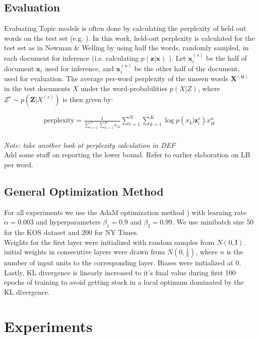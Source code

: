 \documentclass{report}
\begin{document}
	\subsection{Evaluation}
	Evaluating Topic models is often done by calculating the perplexity of held out words on the test set (e.g. \cite{blei2003latent, newman2007distributed, ranganath2015deep}). In this work, held-out perplexity is calculated for the test set as in Newman \& Welling \cite{newman2007distributed} by using half the words, randomly sampled, in each document for inference (i.e. calculating $p(\mathbf{z}|\mathbf{x})$ ). Let $\mathbf{x}_{i}^{(s)}$ be the half of document $\mathbf{x}_i$ used for inference, and $\mathbf{x}_{i}^{(u)}$ be the other half of the document, used for evaluation. The average per-word perplexity of the unseen words $\mathbf{X^{(u)}}$ in the test documents $X$ under the word-probabilities $p(X|Z)$, where $Z^s \sim p(\mathbf{Z}|X^{(s)})$ is then given by:
	
	
	\begin{align}
	\text{perplexity} =  \frac{1}{\sum\limits_{i=1}^{N}\sum\limits_{k=1}^{K}x_{ik}}\sum\limits_{i=1}^N\sum\limits_{k=1}^{K} \log p(x_{k}|\mathbf{z}_{i}^{s})x_{ik}^{u}
	\end{align}\\
	\textit{Note: take another look at perplexity calculation in DEF}
	\\
	Add some stuff on reporting the lower bound. Refer to earlier elaboration on LB per word.
	
	\subsection{General Optimization Method}\label{optim_section}
	For all experiments we use the AdaM optimization method \cite{kingma2014adam}) with learning rate $\alpha = 0.003$ and hyperparameters $\beta_1 = 0.9$ and $\beta_2 = 0.99$. We use minibatch size 50 for the KOS dataset and 200 for NY Times. \\
	Weights for the first layer were initialized with random samples from $N(0,\text{I})$. initial weights in consecutive layers were drawn from  $N(0,\frac{1}{n})$, where $n$ is the number of input units to the corresponding layer. Biases were initialized at 0.
	\\Lastly, KL divergence is linearly increased to it's final value during first 100 epochs of training to avoid getting stuck in a local optimum dominated by the KL divergence. 	

	\section{Experiments}
\end{document}
